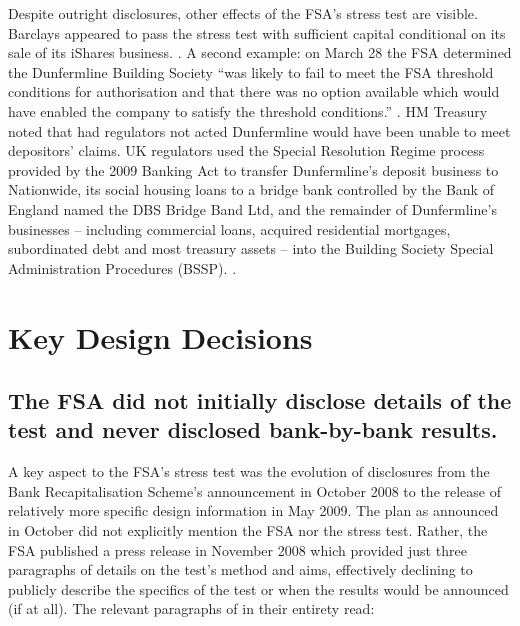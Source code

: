 \documentclass[12pt]{article}
\begin{document}
Despite outright disclosures, other effects of the FSA's stress test are visible. Barclays appeared to pass the stress test with sufficient capital conditional on its sale of its iShares business. \citep{Barclays1}. A second example: on March 28 the FSA determined the Dunfermline Building Society ``was likely to fail to meet the FSA threshold conditions for authorisation and that there was no option available which would have enabled the company to satisfy the threshold conditions.'' \citep{ DunfermlinePress}. HM Treasury noted that had regulators not acted Dunfermline would have been unable to meet depositors' claims. UK regulators used the Special Resolution Regime process provided by the 2009 Banking Act to transfer Dunfermline's deposit business to Nationwide, its social housing loans to a bridge bank controlled by the Bank of England named the DBS Bridge Band Ltd, and the remainder of  Dunfermline's businesses -- including commercial loans, acquired residential mortgages, subordinated debt and most treasury assets -- into the Building Society Special Administration Procedures (BSSP). \citep{ DunfermlinePress}.

\section{Key Design Decisions}\label{keydesign}

\subsection{The FSA did not initially disclose details of the test and never disclosed bank-by-bank results.}

A key aspect to the FSA's stress test was the evolution of disclosures from the Bank Recapitalisation Scheme's announcement in October 2008 to the release of relatively more specific design information in May 2009. The plan as announced in October did not explicitly mention the FSA nor the stress test. Rather, the FSA published a press release in November 2008 which provided just three paragraphs of details on the test's method and aims, effectively declining to publicly describe the specifics of the test or when the results would be announced (if at all). The relevant paragraphs of \citet{Nov2008} in their entirety read:
\end{document}

